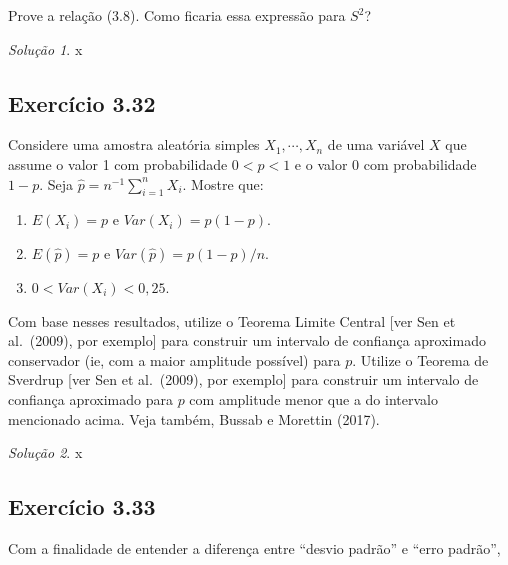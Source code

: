\documentclass[
]{latex/krantz}
\providecommand{\tightlist}{%
  \setlength{\itemsep}{0pt}\setlength{\parskip}{0pt}}
\theoremstyle{definition}
\theoremstyle{definition}
\theoremstyle{definition}
\theoremstyle{definition}
\theoremstyle{remark}
\newtheorem*{solution}{Solução}
\begin{document}
Prove a relação (3.8). Como ficaria essa expressão para \(S^{2}\)?

\begin{solution}
x
\end{solution}

\hypertarget{exr3-32}{%
\subsection*{Exercício 3.32}\label{exr3-32}}

Considere uma amostra aleatória simples \(X_{1}, \cdots , X_{n}\) de uma variável \(X\) que assume o valor 1 com probabilidade \(0 < p < 1\) e o valor 0 com probabilidade \(1 - p\). Seja \(\hat{p} = n^{-1} \sum_{i=1}^{n} X_{i}\). Mostre que:

\begin{enumerate}
\def\labelenumi{\roman{enumi})}
\tightlist
\item
  \(E(X_{i}) = p\) e \(Var(X_{i}) = p (1 - p)\).
\item
  \(E(\hat{p}) = p\) e \(Var(\hat{p}) = p (1 - p) / n\).
\item
  \(0 < Var(X_{i}) < 0,25\).
\end{enumerate}

Com base nesses resultados, utilize o Teorema Limite Central {[}ver Sen et al.~(2009), por exemplo{]} para construir um intervalo de confiança aproximado conservador (ie, com a maior amplitude possível) para \(p\). Utilize o Teorema de Sverdrup {[}ver Sen et al.~(2009), por exemplo{]} para construir um intervalo de confiança aproximado para \(p\) com amplitude menor que a do intervalo mencionado acima. Veja também, Bussab e Morettin (2017).

\begin{solution}
x
\end{solution}

\hypertarget{exr3-33}{%
\subsection*{Exercício 3.33}\label{exr3-33}}

Com a finalidade de entender a diferença entre ``desvio padrão'' e ``erro padrão'',
\end{document}
